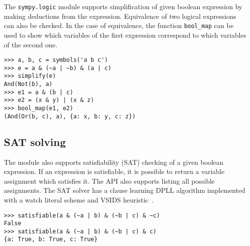 The \texttt{sympy.logic} module supports simplification of given boolean expression by making
deductions from the expression. Equivalence of two logical expressions can also
be checked. In the case of equivalence, the function \texttt{bool\_map}
can be used to show which variables of the first expression correspond
to which variables of the second one.

\begin{verbatim}
>>> a, b, c = symbols('a b c')
>>> e = a & (~a | ~b) & (a | c)
>>> simplify(e)
And(Not(b), a)
>>> e1 = a & (b | c)
>>> e2 = (x & y) | (x & z)
>>> bool_map(e1, e2)
(And(Or(b, c), a), {a: x, b: y, c: z})
\end{verbatim}

\subsection{SAT solving}

The module also supports satisfiability (SAT) checking of a given boolean
expression. If an expression is satisfiable, it is possible to return
a variable assignment which satisfies it. The API also supports
listing all possible assignments.
The SAT solver has a clause learning DPLL algorithm implemented with a watch
literal scheme and VSIDS heuristic~\cite{moskewicz2008method}.

\begin{verbatim}
>>> satisfiable(a & (~a | b) & (~b | c) & ~c)
False
>>> satisfiable(a & (~a | b) & (~b | c) & c)
{a: True, b: True, c: True}
\end{verbatim}
